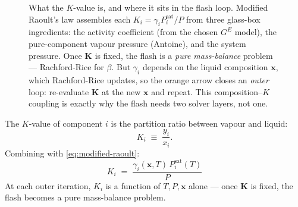 \documentclass[11pt,a4paper]{article}
\newcommand{\Psat}{P^{\mathrm{sat}}}
\newcommand{\Gex}{G^{E}}
\newcommand{\xv}{\mathbf{x}}
\newcommand{\Kv}{\mathbf{K}}
\begin{document}
\begin{figure}[ht]\centering
{}
\caption{What the $K$-value is, and where it sits in the flash loop.
Modified Raoult's law assembles each $K_i=\gamma_iP_i^{\mathrm{sat}}/P$
from three glass-box ingredients: the activity coefficient (from the
chosen $\Gex$ model), the pure-component vapour pressure (Antoine), and
the system pressure.  Once $\Kv$ is fixed, the flash is a \emph{pure
mass-balance} problem --- Rachford-Rice for $\beta$.  But $\gamma_i$
depends on the liquid composition $\xv$, which Rachford-Rice updates, so
the orange arrow closes an \emph{outer} loop: re-evaluate $\Kv$ at the new
$\xv$ and repeat.  This composition--$K$ coupling is exactly why the flash
needs two solver layers, not one.}
\label{fig:kvalue-assembly}
\end{figure}


The $K$-value of component $i$ is the partition ratio between vapour
and liquid:
\begin{equation}
   K_i \;\equiv\; \frac{y_i}{x_i}.
   \label{eq:K-def}
\end{equation}
Combining with \eqref{eq:modified-raoult}:
\begin{equation}
   \boxed{\;
   K_i \;=\; \frac{\gamma_i(\xv, T) \, \Psat_i(T)}{P}
   \;}
   \label{eq:K-modified-raoult}
\end{equation}
At each outer iteration, $K_i$ is a function of $T, P, \xv$ alone ---
once $\Kv$ is fixed, the flash becomes a pure mass-balance problem.
\end{document}
